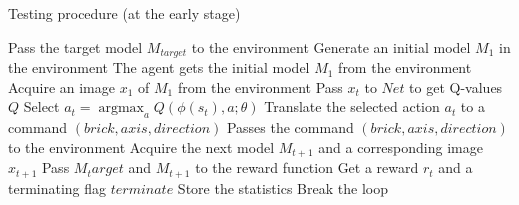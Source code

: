 \documentclass[a4paper]{article}
\DeclareMathOperator{\argmax}{argmax}
\begin{document}
            \begin{algorithm}
                \caption{Testing procedure (at the early stage)} \label{alg:test1}
                \begin{algorithmic}
                        \State Pass the target model $M_{target}$ to the environment
                        \State Generate an initial model $M_1$ in the environment
                        \State The agent gets the initial model $M_1$ from the environment
                        \State Acquire an image $x_1$ of $M_1$ from the environment
                            \State Pass $x_t$ to $Net$ to get Q-values $Q$
                            \State Select $a_t = \argmax_a Q(\phi(s_t), a;\theta)$
                            \State Translate the selected action $a_t$ to a command $(brick, axis, direction)$
                            \State Passes the command $(brick, axis, direction)$ to the environment
                            \State Acquire the next model $M_{t+1}$ and a corresponding image $x_{t+1}$
                            \State Pass $M_target$ and $M_{t+1}$ to the reward function
                            \State Get a reward $r_t$ and a terminating flag $terminate$
                            \State Store the statistics
                                \State Break the loop 
                            \EndIf
                            
                        \EndFor
                    \EndProcedure
                \end{algorithmic}
            \end{algorithm}
            
            \newpage

            
            
            
            
            

            
\end{document}
